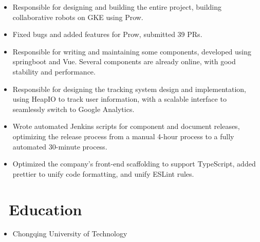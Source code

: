 \documentclass{resume}
\newcommand{\en}[1]{#1}
\newcommand{\zh}[1]{}
\begin{document}
\en{}
\zh{\role{社区前后端开发工程师}{\href{https://github.com/ti-community-infra/tichi}{TiChi} 研发}}
\begin{itemize}
      \item \en{Responsible for designing and building the entire project, building collaborative robots on GKE using Prow.}
            \zh{负责设计和构建整个项目，使用 Prow 在 GKE 上搭建协作机器人。}
      \item \en{Fixed bugs and added features for Prow, submitted 39 PRs.}
            \zh{为 Prow 修复 bug 和添加功能，提交了 39 个 PR。}
\end{itemize}

\en{}
\zh{\datedsubsection{\textbf{\href{https://www.morningstar.com/}{晨星资讯（Morningstar, Inc. ）}}}{2019/06 -- 2020/07}}
\en{}
\zh{\role{前后端开发工程师}{组件开发}}
\begin{itemize}
      \item \en{Responsible for writing and maintaining some components, developed using springboot and Vue. Several components are already online, with good stability and performance.}
            \zh{负责独立组件的编写和维护，使用 springboot 和 Vue 开发。多个组件已经上线使用，有较好的稳定性和性能。}
      \item \en{Responsible for designing the tracking system design and implementation, using HeapIO to track user information, with a scalable interface to seamlessly switch to Google Analytics.}
            \zh{负责设计和实现前端 tracking 系统，使用 HeapIO 追踪用户信息，并预留可扩展接口，可无缝切换至 Google Analytics。}
      \item \en{Wrote automated Jenkins scripts for component and document releases, optimizing the release process from a manual 4-hour process to a fully automated 30-minute process.}
            \zh{为组件和文档发布编写了自动化 Jenkins 脚本，将发布流程从手动 4 小时优化到全自动 30 分钟。}
      \item \en{Optimized the company's front-end scaffolding to support TypeScript, added prettier to unify code formatting, and unify ESLint rules.}
            \zh{优化公司前端脚手架，使其支持 TypeScript，添加 prettier 统一代码格式，优化统一 ESLint 规则。}
\end{itemize}

\section{\faGraduationCap\ \en{Education}\zh{教育经历}}
\en{}
\zh{\datedsubsection{\textbf{软件工程 本科}}{2015/09 -- 2019/06}}
\begin{itemize}
      \item \en{Chongqing University of Technology}
            \zh{重庆理工大学}
\end{itemize}
\end{document}
